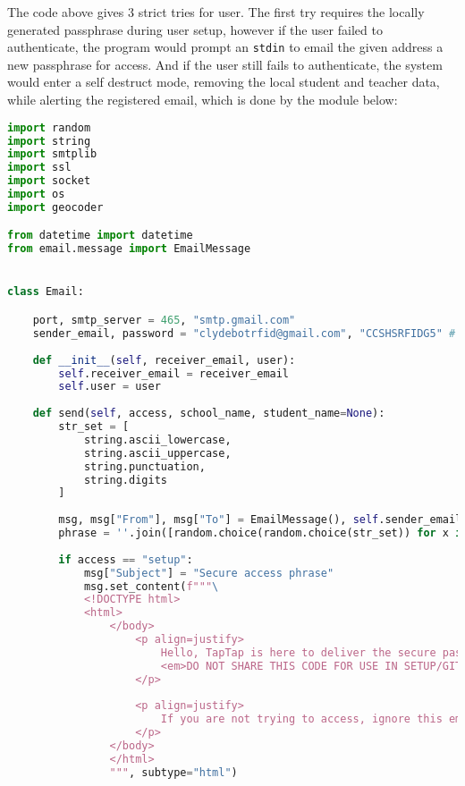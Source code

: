 \documentclass[12pt]{article}
\begin{document}
The code above gives 3 strict tries for user. The first try requires the locally generated passphrase during user setup, however if the user failed to authenticate, the program would prompt an \texttt{stdin} to email the given address a new passphrase for access. And if the user still fails to authenticate, the system would enter a self destruct mode, removing the local student and teacher data, while alerting the registered email, which is done by the module below:

\singlespacing
\begin{lstlisting}[language=Python, caption={\texttt{code\_email.py}}]
import random
import string
import smtplib
import ssl
import socket
import os
import geocoder

from datetime import datetime
from email.message import EmailMessage


class Email:

	port, smtp_server = 465, "smtp.gmail.com"
	sender_email, password = "clydebotrfid@gmail.com", "CCSHSRFIDG5" # fill up later
	
	def __init__(self, receiver_email, user):
		self.receiver_email = receiver_email
		self.user = user
	
	def send(self, access, school_name, student_name=None):
		str_set = [
			string.ascii_lowercase,
			string.ascii_uppercase,
			string.punctuation,
			string.digits
		]
	
		msg, msg["From"], msg["To"] = EmailMessage(), self.sender_email, self.receiver_email
		phrase = ''.join([random.choice(random.choice(str_set)) for x in range(32)])
		
		if access == "setup": 
			msg["Subject"] = "Secure access phrase"
			msg.set_content(f"""\
			<!DOCTYPE html>
			<html>
				</body>
					<p align=justify>
						Hello, TapTap is here to deliver the secure passphrase requested by: <b>{self.receiver_email} ({self.user}) from {school_name}.</b>,<br><br>
						<em>DO NOT SHARE THIS CODE FOR USE IN SETUP/GIT PULL OF THE DATABASE</em>. This is the secure phrase for your access of the student and teacher data in repository setup: <br><br><center><b><code>{phrase}</code></b></center>
					</p>
				
					<p align=justify> 
						If you are not trying to access, ignore this email. The details of the computer are:<br><br>User: <i>{os.getlogin()}</i><br>HOSTNAME: <i>{socket.gethostname()}</i><br>IP address: <i>{socket.gethostbyname(socket.gethostname())}</i><br>Tracked from: <i>{geocoder.ip('me')}) at {datetime.now().strftime('%d/%m/%Y %H:%M:%S')}</i>.<blockquote>Cheers,<br>TapTap team</blockquote>
					</p>
				</body>
				</html>
				""", subtype="html")    
				

\end{lstlisting}
\end{document}
